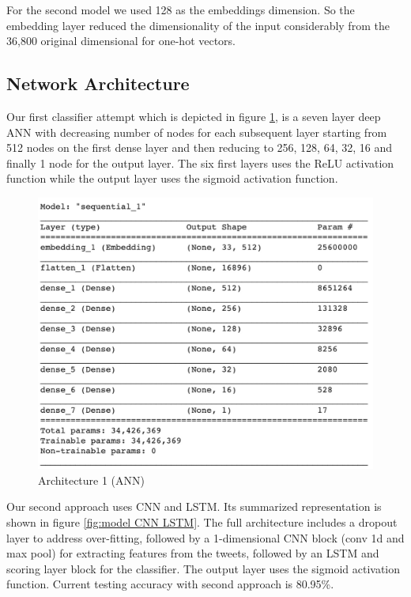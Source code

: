 \documentclass[conference]{sig-alternate-05-2015}
\begin{document}
For the second model we used 128 as the embeddings dimension. So the  embedding layer reduced the dimensionality of the input considerably from the 36,800 original dimensional for one-hot vectors.

\subsection{Network Architecture}
Our first classifier attempt which is depicted in figure \ref{fig:model ANN}, is a seven layer deep ANN with decreasing number of nodes for each subsequent layer starting from 512 nodes on the first dense layer and then reducing to 256, 128, 64, 32, 16 and finally 1 node for the output layer. The six first layers uses the ReLU activation function while the output layer uses the sigmoid activation function.

\begin{figure}
	\centering
	\includegraphics[width=0.8\linewidth]{"Model_ANN"}
	\caption{Architecture 1 (ANN)}
	\label{fig:model ANN}
\end{figure}

Our second approach uses CNN and LSTM. Its summarized representation is shown in figure \ref{fig:model CNN LSTM}. The full architecture includes a dropout layer to address over-fitting, followed by a 1-dimensional CNN block (conv 1d and max pool) for extracting features from the tweets, followed by an LSTM and scoring layer block for the classifier. The output layer uses the sigmoid activation function. Current testing accuracy with second approach is 80.95\%.
\end{document}
